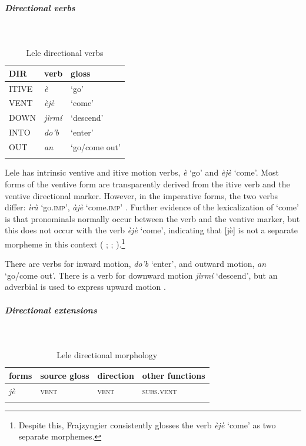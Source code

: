 
\subparagraph{Directional verbs}~

\begin{table}[H]
	\caption{Lele directional verbs}
	\label{tab:leleV}
	\begin{tabular}{lll} %
		\lsptoprule
		DIR & verb & gloss   \\ %
		\midrule
		ITIVE & \textit{è} & `go' \\
		VENT & \textit{èjè} & `come' \\
		DOWN & \textit{jìrmí} & `descend' \\
		INTO& \textit{do'b} & `enter' \\
		OUT & \textit{an} & `go/come out' \\
		\lspbottomrule
	\end{tabular}
\end{table}

Lele has intrinsic ventive and itive motion verbs, \textit{è} `go' and \textit{èjè} `come'. Most forms of the ventive form are transparently derived from the itive verb and the ventive directional marker. However, in the imperative forms, the two verbs differ: \textit{ìrà} `go.\textsc{imp}', \textit{àjè} `come.\textsc{imp}' \citep[50]{frajzyngierGrammarLele2001}. Further evidence of the lexicalization of `come' is that pronominals normally occur between the verb and the ventive marker, but this does not occur with the verb \textit{èjè} `come', indicating that [jè] is not a separate morpheme in this context (\citeauthor{frajzyngierGrammarLele2001} \citeyear[202]{frajzyngierGrammarLele2001}; \citeauthor{simonscopeNeBeMarking1982} \citeyear[228]{simonscopeNeBeMarking1982}; \citeauthor{146082} \citeyear[21]{146082}).\footnote{Despite this, Frajzyngier consistently glosses the verb \textit{èjè} `come' as two separate morphemes.}

There are verbs for inward motion, \textit{do'b} `enter', and outward motion, \textit{an} `go{\slash}come out'. There is a verb for downward motion \textit{jìrmí} `descend', but an adverbial is used to express upward motion \citep{146082,frajzyngierGrammarLele2001}.

\subparagraph{Directional extensions}~

\begin{table}[H]
	\caption{Lele directional morphology}
	\label{tab:lele}
	\begin{tabular}{llll} %
		\lsptoprule
		forms & source gloss & direction  & other functions  \\ %
		\midrule
		\textit{jè}  &  \textsc{vent}  & \textsc{vent}  &  \textsc{subs.vent} \\
		\lspbottomrule
	\end{tabular}
\end{table}

